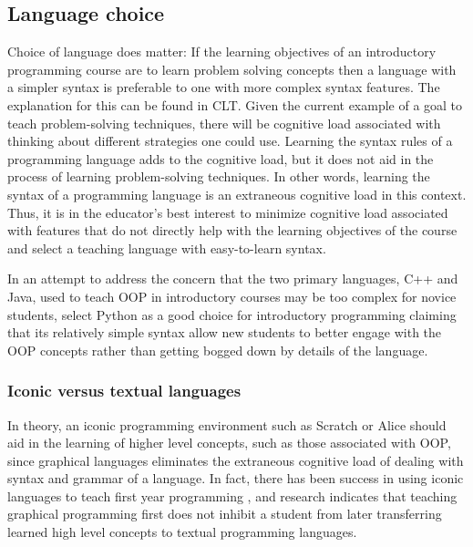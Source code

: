 \documentclass[12pt]{article}
\begin{document}
\subsection*{Language choice}
Choice of language does matter: If the learning objectives of an
introductory programming course are to learn problem solving concepts
then a language with a simpler syntax is preferable to one with more
complex syntax features\autocite{koulouri_teaching_2014}. The
explanation for this can be found in CLT. Given the current example of
a goal to teach problem-solving techniques, there will be cognitive
load associated with thinking about different strategies one could
use. Learning the syntax rules of a programming language adds to the
cognitive load, but it does not aid in the process of learning
problem-solving techniques. In other words, learning the syntax of a
programming language is an extraneous cognitive load in this
context. Thus, it is in the educator's best interest to minimize
cognitive load associated with features that do not directly help with
the learning objectives of the course and select a teaching language
with easy-to-learn syntax.

In an attempt to address the concern that the two primary languages,
C++ and Java, used to teach OOP in introductory courses may be too
complex for novice students, \citeauthor{goldwasser_teaching_2008}
select Python as a good choice for introductory programming claiming
that its relatively simple syntax allow new students to better engage
with the OOP concepts rather than getting bogged down by details of
the language\autocite{goldwasser_teaching_2008}.

\subsubsection*{Iconic versus textual languages}

In theory, an iconic programming environment such as
Scratch\autocite{resnick_scratch_2009} or
Alice\autocite{cooper_using_2003} should aid in the learning of higher
level concepts, such as those associated with OOP, since graphical
languages eliminates the extraneous cognitive load of dealing with
syntax and grammar of a language. In fact, there has been success in
using iconic languages to teach first year programming
\autocite{calloni_iconic_1997}, and research indicates that teaching
graphical programming first does not inhibit a student from later
transferring learned high level concepts to textual programming
languages\autocite{hundhausen_can_2009}.
\end{document}
